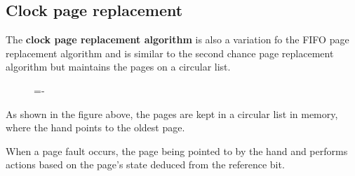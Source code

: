 \documentclass[a4paper]{systems-software}
\begin{document}
\subsection*{Clock page replacement}

The \textbf{clock page replacement algorithm} is also a variation fo the FIFO page replacement algorithm and is similar to the second chance page replacement algorithm but maintains the pages on a circular list.

\begin{figure}[H]
  \lineskip=-\fboxrule
\end{figure}

As shown in the figure above, the pages are kept in a circular list in memory, where the hand points to the oldest page.

When a page fault occurs, the page being pointed to by the hand and performs actions based on the page's state deduced from the reference bit.
\end{document}
